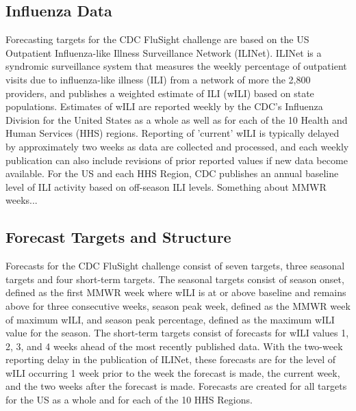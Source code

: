 \documentclass{article}
\begin{document}
\subsection{Influenza Data}
Forecasting targets for the CDC FluSight challenge are based on the US Outpatient Influenza-like Illness Surveillance Network (ILINet). ILINet is a syndromic surveillance system that measures the weekly percentage of outpatient visits due to influenza-like illness (ILI) from a network of more the 2,800 providers, and publishes a weighted estimate of ILI (wILI) based on state populations. Estimates of wILI are reported weekly by the CDC's Influenza Division for the United States as a whole as well as for each of the 10 Health and Human Services (HHS) regions. Reporting of 'current' wILI is typically delayed by approximately two weeks as data are collected and processed, and each weekly publication can also include revisions of prior reported values if new data become available. For the US and each HHS Region, CDC publishes an annual baseline level of ILI activity based on off-season ILI levels. Something about MMWR weeks...

\subsection{Forecast Targets and Structure}
Forecasts for the CDC FluSight challenge consist of seven targets, three seasonal targets and four short-term targets. The seasonal targets consist of season onset, defined as the first MMWR week where wILI is at or above baseline and remains above for three consecutive weeks, season peak week, defined as the MMWR week of maximum wILI, and season peak percentage, defined as the maximum wILI value for the season. The short-term targets consist of forecasts for wILI values 1, 2, 3, and 4 weeks ahead of the most recently published data. With the two-week reporting delay in the publication of ILINet, these forecasts are for the level of wILI occurring 1 week prior to the week the forecast is made, the current week, and the two weeks after the forecast is made. Forecasts are created for all targets for the US as a whole and for each of the 10 HHS Regions.
\end{document}
